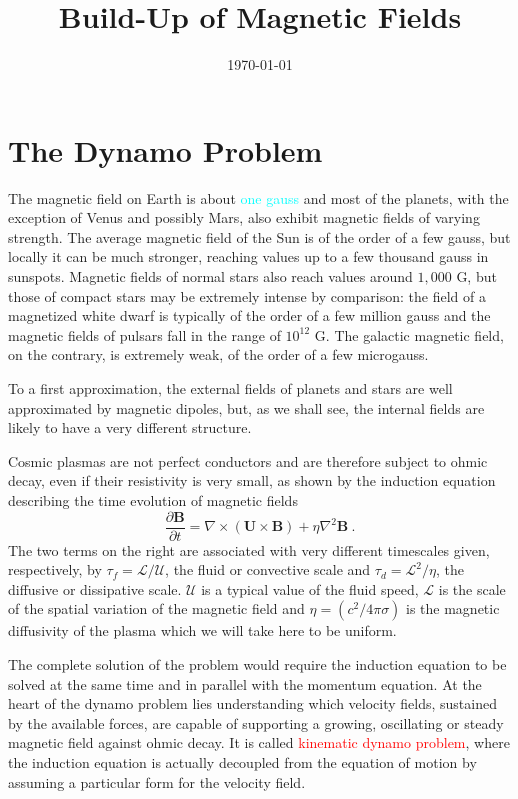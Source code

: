 \documentclass[12pt,a4paper]{article}
\title{Build-Up of Magnetic Fields}
\author{}
\date{\today}
\renewcommand{\vec}[1]{\boldsymbol{#1}}
\begin{document}
\maketitle

\section{The Dynamo Problem}
\cite{2015bps..book.....C} The magnetic field on Earth is about \textcolor{cyan}{one gauss} and most of the planets, with the exception of Venus and possibly Mars, also exhibit magnetic fields of varying strength. The average magnetic field of the Sun is of the order of a few gauss, but locally it can be much stronger, reaching values up to a few thousand gauss in sunspots. Magnetic fields of normal stars also reach values around $1,000$ G, but those of compact stars may be extremely intense by comparison: the field of a magnetized white dwarf is typically of the order of a few million gauss and the magnetic fields of pulsars fall in the range of $10^{12}$ G. The galactic magnetic field, on the contrary, is extremely weak, of the order of a few microgauss.

To a first approximation, the external fields of planets and stars are well approximated by magnetic dipoles, but, as we shall see, the internal fields are likely to have a very different structure.

Cosmic plasmas are not perfect conductors and are therefore subject to ohmic decay, even if their resistivity is very small, as shown by the induction equation describing the time evolution of magnetic fields 
\begin{equation}
\frac{\partial \vec{B}}{\partial t} = \nabla \times (\vec{U} \times \vec{B}) +\eta \nabla^2 \vec{B} ~.
\end{equation}
The two terms on the right are associated with very different timescales given, respectively, by $\tau_f = \mathcal{L/U}$, the fluid or convective scale and $\tau_d = \mathcal L^2/\eta$, the diffusive or dissipative scale. $\mathcal U$ is a typical value of the fluid speed, $\mathcal L$ is the scale of the spatial variation of the magnetic field and $\eta = (c^2/4\pi \sigma)$ is the magnetic diffusivity of the plasma which we will take here to be uniform.

The complete solution of the problem would require the induction equation to be solved at the same time and in parallel with the momentum equation. At the heart of the dynamo problem lies understanding which velocity fields, sustained by the available forces, are capable of supporting a growing, oscillating or steady magnetic field against ohmic decay. It is called \textcolor{red}{kinematic dynamo problem}, where the induction equation is actually decoupled from the equation of motion by assuming a particular form for the velocity field. 
\end{document}

